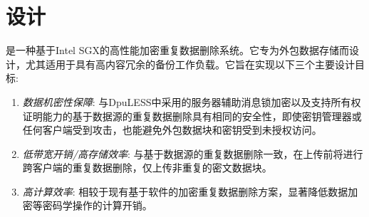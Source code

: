 \section{\sysnameS 设计}
\label{sec:sgxdedup-design}


\sysnameS 是一种基于Intel SGX的高性能加密重复数据删除系统。它专为外包数据存储而设计，尤其适用于具有高内容冗余的备份工作负载。它旨在实现以下三个主要设计目标:
\begin{enumerate}
    \item \textit{数据机密性保障}: 与DpuLESS\cite{bellare13b}中采用的服务器辅助消息锁加密以及支持所有权证明\cite{halevi11}能力的基于数据源的重复数据删除具有相同的安全性，即使密钥管理器或任何客户端受到攻击，\sysnameS 也能避免外包数据块和密钥受到未授权访问。
    \item \textit{低带宽开销/高存储效率}: 与基于数据源的重复数据删除一致，\sysnameS 在上传前将进行跨客户端的重复数据删除，仅上传非重复的密文数据块。
    \item \textit{高计算效率}: 相较于现有基于软件的加密重复数据删除方案，\sysnameS 显著降低数据加密等密码学操作的计算开销。
\end{enumerate}

